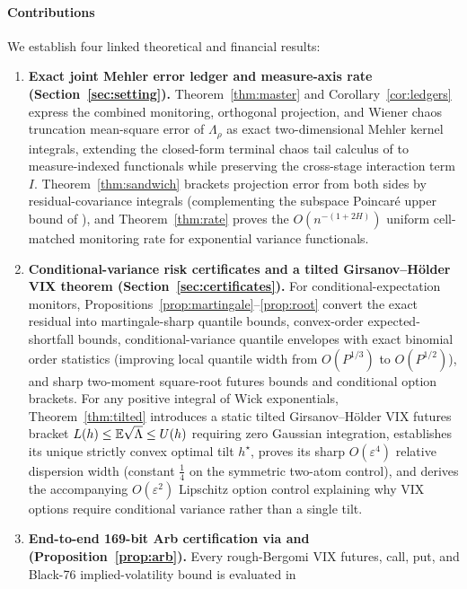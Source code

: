 \paragraph{Contributions}
We establish four linked theoretical and financial results:
\begin{enumerate}
\item \textbf{Exact joint Mehler error ledger and measure-axis rate (Section~\ref{sec:setting}).}
  Theorem~\ref{thm:master} and Corollary~\ref{cor:ledgers} express the combined monitoring, orthogonal
  projection, and Wiener chaos truncation mean-square error of $\Lambda_\rho$ as exact two-dimensional
  Mehler kernel integrals, extending the closed-form terminal chaos tail calculus of
  \citet{AHMED2026111045} to measure-indexed functionals while preserving the cross-stage interaction
  term $I$. Theorem~\ref{thm:sandwich} brackets projection error from both sides by residual-covariance
  integrals (complementing the subspace Poincar\'e upper bound of \citealp{ZahmConstantinePrieurMarzouk2020}),
  and Theorem~\ref{thm:rate} proves the $O(n^{-(1+2H)})$ uniform cell-matched monitoring rate for
  exponential variance functionals.
\item \textbf{Conditional-variance risk certificates and a tilted Girsanov--H\"older VIX theorem
  (Section~\ref{sec:certificates}).}
  For conditional-expectation monitors, Propositions~\ref{prop:martingale}--\ref{prop:root} convert the
  exact residual into martingale-sharp quantile bounds, convex-order expected-shortfall bounds,
  conditional-variance quantile envelopes with exact binomial order statistics (improving local quantile
  width from $O(P^{1/3})$ to $O(P^{1/2})$), and sharp two-moment square-root futures bounds and conditional option brackets.
  For any positive integral of Wick exponentials, Theorem~\ref{thm:tilted} introduces a static tilted
  Girsanov--H\"older VIX futures bracket $L(h)\le\mathbb{E}\sqrt{\Lambda}\le U(h)$ requiring zero Gaussian
  integration, establishes its unique strictly convex optimal tilt $h^\star$, proves its sharp
  $O(\varepsilon^4)$ relative dispersion width (constant $\tfrac14$ on the symmetric two-atom control), and derives the
  accompanying $O(\varepsilon^2)$ Lipschitz option control explaining why VIX options require conditional
  variance rather than a single tilt.
\item \textbf{End-to-end 169-bit Arb certification via \RoughCertTilt{} and \RoughCertCV{}
  (Proposition~\ref{prop:arb}).}
  Every rough-Bergomi VIX futures, call, put, and Black-76 implied-volatility bound is evaluated in

\end{enumerate}
